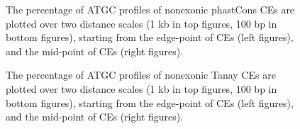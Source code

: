 \documentclass[12pt]{report}
\begin{document}
\begin{figure}[htbp]
\centering
{}
\caption{The percentage of ATGC profiles of nonexonic phastCons CEs are plotted over two distance scales (1 kb in top figures, 100 bp in bottom figures), starting from the edge-point of CEs (left figures), and the mid-point of CEs (right figures).}
\label{fig:ATGC_phast}
\end{figure}

\begin{figure}[htbp]
\centering
{}
\caption{The percentage of ATGC profiles of nonexonic Tanay CEs are plotted over two distance scales (1 kb in top figures, 100 bp in bottom figures), starting from the edge-point of CEs (left figures), and the mid-point of CEs (right figures).}
\label{fig:ATGC_1_1_tan}
\end{figure}
\end{document}
